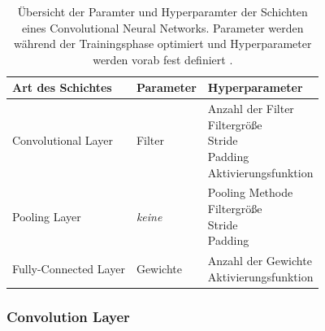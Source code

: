   \begin{table}
	\centering
	\caption{Übersicht der Paramter und Hyperparamter der Schichten eines Convolutional Neural Networks. Parameter werden während der Trainingsphase optimiert und Hyperparameter werden vorab fest definiert \cite{yamashitaConvolutionalNeuralNetworks2018}. }
	\begin{tabularx}{0.9\textwidth}{X X X}
		\textbf{Art des Schichtes} & \textbf{Parameter} & \textbf{Hyperparameter}\\
		\hline
		Convolutional Layer & Filter & \makecell[tl]{
			Anzahl der Filter\\
			Filtergröße\\
			Stride\\
			Padding\\
			Aktivierungsfunktion
		}\\
		\hline
		Pooling Layer &  \textit{keine}  & \makecell[tl]{
			Pooling Methode\\
			Filtergröße\\
			Stride\\
			Padding
		}\\
		\hline
		Fully-Connected Layer & Gewichte & \makecell[tl]{
			Anzahl der Gewichte\\
			Aktivierungsfunktion
		}\\
		\hline
	\end{tabularx}
	\label{tab:layer_param}
\end{table}


\subsubsection{Convolution Layer}
\lipsum[45-55]
\lipsum[45-55]
